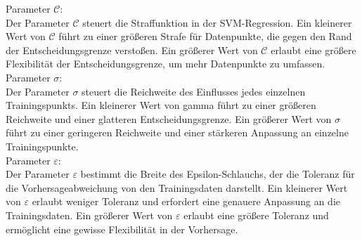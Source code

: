 \documentclass[a4paper,12pt]{article}
\begin{document}
Parameter $\mathcal{C}$:\\

Der Parameter $\mathcal{C}$ steuert die Straffunktion in der SVM-Regression. 
Ein kleinerer Wert von $\mathcal{C}$ führt zu einer größeren Strafe für Datenpunkte, 
die gegen den Rand der Entscheidungsgrenze verstoßen. Ein größerer Wert von $\mathcal{C}$ erlaubt eine 
größere Flexibilität der Entscheidungsgrenze, um mehr Datenpunkte zu umfassen. \\




Parameter $\sigma$:\\

Der Parameter $\sigma$ steuert die Reichweite des Einflusses jedes 
einzelnen Trainingspunkts. Ein kleinerer Wert von gamma führt zu einer größeren Reichweite 
und einer glatteren Entscheidungsgrenze. Ein größerer Wert von $\sigma$ führt zu einer 
geringeren Reichweite und einer stärkeren Anpassung an einzelne Trainingspunkte. \\



Parameter $\varepsilon$:\\

Der Parameter $\varepsilon$ bestimmt die Breite des Epsilon-Schlauchs, 
der die Toleranz für die Vorhersageabweichung von den Trainingsdaten darstellt. 
Ein kleinerer Wert von $\varepsilon$ erlaubt weniger Toleranz und erfordert eine 
genauere Anpassung an die Trainingsdaten. 
Ein größerer Wert von $\varepsilon$ erlaubt eine größere Toleranz und ermöglicht eine 
gewisse Flexibilität in der Vorhersage.
\end{document}
